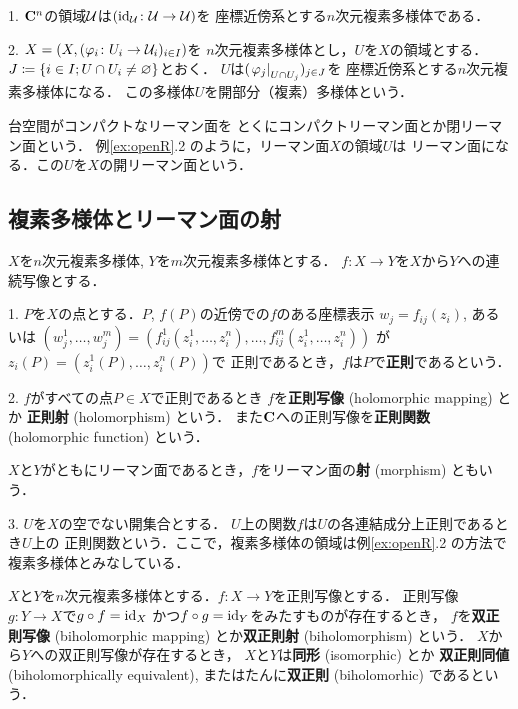\begin{Example}\label{ex:openR}
    1. 
    $\mathbf{C}^n$の領域$\mathcal{U}$は$(\mathrm{id}_{\mathcal{U}}\colon\mathcal{U}\to\mathcal{U})$を
    座標近傍系とする$n$次元複素多様体である．

    2. 
    $X=(X, (\varphi_{i}\colon U_{i}\to \mathcal{U}_{i})_{i\in I})$を
    $n$次元複素多様体とし，$U$を$X$の領域とする．
    $J\coloneqq\{i\in I; U\cap U_i \neq \varnothing\}$とおく．
    $U$は$(\left. \varphi_{j} \right|_{U\cap U_{j}})_{j\in J}$を
    座標近傍系とする$n$次元複素多様体になる．
    この多様体$U$を開部分（複素）多様体という．
\end{Example}

台空間がコンパクトなリーマン面を
とくにコンパクトリーマン面とか閉リーマン面という．
例\ref{ex:openR}.2 のように，リーマン面$X$の領域$U$は
リーマン面になる．この$U$を$X$の開リーマン面という．

\subsection{複素多様体とリーマン面の射}
\begin{Definition}
    $X$を$n$次元複素多様体, $Y$を$m$次元複素多様体とする．
    $f\colon X\to Y$を$X$から$Y$への連続写像とする．
    
    1. 
    $P$を$X$の点とする．$P$, $f(P)$の近傍での$f$のある座標表示
    $w_j=f_{ij}(z_i)$, あるいは
    $(w_{j}^{1},\dots,w_{j}^{m})
    =\left(f_{ij}^{1}(z_{i}^{1},\dots,z_{i}^{n}),\dots,f_{ij}^{m}(z_{i}^{1},\dots,z_{i}^{n})\right)$
    が$z_i(P)=(z_{i}^{1}(P),\dots,z_{i}^{n}(P))$で
    正則であるとき，$f$は$P$で\textbf{正則}であるという．
    
    2. 
    $f$がすべての点$P\in X$で正則であるとき
    $f$を\textbf{正則写像} (holomorphic mapping) とか
    \textbf{正則射} (holomorphism) という．
    また$\mathbf{C}$への正則写像を\textbf{正則関数} (holomorphic 
    function) という．

    $X$と$Y$がともにリーマン面であるとき，$f$をリーマン面の\textbf{射} (morphism) ともいう．

    3. 
    $U$を$X$の空でない開集合とする．
    $U$上の関数$f$は$U$の各連結成分上正則であるとき$U$上の
    正則関数という．ここで，複素多様体の領域は例\ref{ex:openR}.2 の方法で
    複素多様体とみなしている．
\end{Definition}

\begin{Definition}
    $X$と$Y$を$n$次元複素多様体とする．$f\colon X\to Y$を正則写像とする．
    正則写像$g\colon Y\to X$で$g\circ f=\mathrm{id}_X$
    かつ$f\circ g=\mathrm{id}_Y$をみたすものが存在するとき，
    $f$を\textbf{双正則写像} (biholomorphic mapping) とか\textbf{双正則射} (biholomorphism) という．
    $X$から$Y$への双正則写像が存在するとき，
    $X$と$Y$は\textbf{同形} (isomorphic) とか 
    \textbf{双正則同値} (biholomorphically equivalent), 
    またはたんに\textbf{双正則} (biholomorhic) であるという．
\end{Definition}
